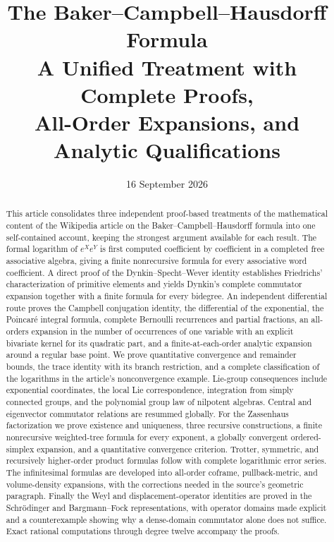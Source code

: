 \documentclass[11pt,a4paper]{article}
\title{\textbf{The Baker--Campbell--Hausdorff Formula}\\[0.4em]
\large A Unified Treatment with Complete Proofs,\\All-Order Expansions, and Analytic Qualifications}
\author{}
\date{16 September 2026}
\numberwithin{equation}{section}
\theoremstyle{definition}
\theoremstyle{remark}
\begin{document}
\maketitle
\begin{abstract}
This article consolidates three independent proof-based treatments of the
mathematical content of the Wikipedia article on the Baker--Campbell--Hausdorff
formula into one self-contained account, keeping the strongest argument
available for each result. The formal logarithm of $e^Xe^Y$ is first computed
coefficient by coefficient in a completed free associative algebra, giving a
finite nonrecursive formula for every associative word coefficient. A direct
proof of the Dynkin--Specht--Wever identity establishes Friedrichs'
characterization of primitive elements and yields Dynkin's complete commutator
expansion together with a finite formula for every bidegree. An independent
differential route proves the Campbell conjugation identity, the differential
of the exponential, the Poincar\'e integral formula, complete Bernoulli
recurrences and partial fractions, an all-orders expansion in the number of
occurrences of one variable with an explicit bivariate kernel for its quadratic
part, and a finite-at-each-order analytic expansion around a regular base
point. We prove quantitative convergence and remainder bounds, the trace
identity with its branch restriction, and a complete classification of the
logarithms in the article's nonconvergence example. Lie-group consequences
include exponential coordinates, the local Lie correspondence, integration
from simply connected groups, and the polynomial group law of nilpotent
algebras. Central and eigenvector commutator relations are resummed globally.
For the Zassenhaus factorization we prove existence and uniqueness, three
recursive constructions, a finite nonrecursive weighted-tree formula for every
exponent, a globally convergent ordered-simplex expansion, and a quantitative
convergence criterion. Trotter, symmetric, and recursively higher-order
product formulas follow with complete logarithmic error series. The
infinitesimal formulas are developed into all-order coframe, pullback-metric,
and volume-density expansions, with the corrections needed in the source's
geometric paragraph. Finally the Weyl and displacement-operator identities are
proved in the Schr\"odinger and Bargmann--Fock representations, with operator
domains made explicit and a counterexample showing why a dense-domain
commutator alone does not suffice. Exact rational computations through degree
twelve accompany the proofs.
\end{abstract}
\end{document}
